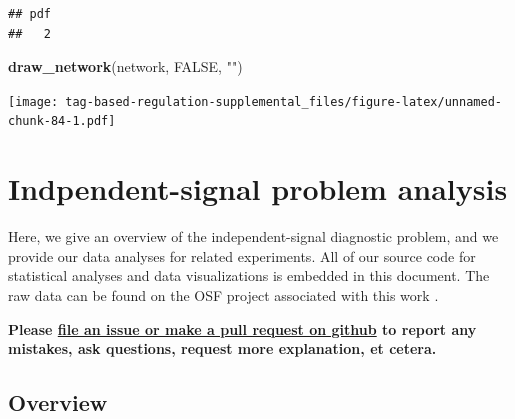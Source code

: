 \documentclass[]{book}
\newenvironment{Shaded}{\begin{snugshade}}{\end{snugshade}}
\newcommand{\KeywordTok}[1]{\textcolor[rgb]{0.13,0.29,0.53}{\textbf{#1}}}
\newcommand{\NormalTok}[1]{#1}
\newcommand{\OtherTok}[1]{\textcolor[rgb]{0.56,0.35,0.01}{#1}}
\newcommand{\StringTok}[1]{\textcolor[rgb]{0.31,0.60,0.02}{#1}}
\begin{document}
\begin{verbatim}
## pdf 
##   2
\end{verbatim}

\begin{Shaded}
\begin{Highlighting}[]
\KeywordTok{draw_network}\NormalTok{(network, }\OtherTok{FALSE}\NormalTok{, }\StringTok{""}\NormalTok{)}
\end{Highlighting}
\end{Shaded}

\texttt{[image: tag-based-regulation-supplemental\_files/figure-latex/unnamed-chunk-84-1.pdf]}

\hypertarget{indpendent-signal-problem-analysis}{%
\chapter{Indpendent-signal problem analysis}\label{indpendent-signal-problem-analysis}}

Here, we give an overview of the independent-signal diagnostic problem, and we provide our data analyses for related experiments.
All of our source code for statistical analyses and data visualizations is embedded in this document.
The raw data can be found on the OSF project associated with this work \citep{Lalejini_Moreno_Ofria_Data_2020}.

\textbf{Please \href{https://github.com/amlalejini/Tag-based-Genetic-Regulation-for-LinearGP/issues}{file an issue or make a pull request on github} to report any mistakes, ask questions, request more explanation, et cetera.}

\hypertarget{overview-3}{%
\section{Overview}\label{overview-3}}
\end{document}
